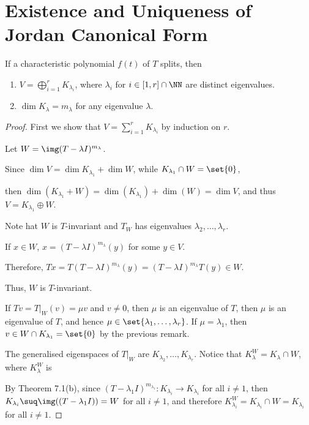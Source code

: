 \documentclass[11pt]{scrartcl}
\begin{document}
\section{Existence and Uniqueness of Jordan Canonical Form}

\begin{theorem}
  If a characteristic polynomial $f(t)$ of $T$ splits, then
  \begin{enumerate}[label=\alph*)]
  \item $V = \bigoplus_{i=1}^r K_{\lambda_i}$, where $\lambda_i$ for $i\in [1, r]\cap\NN$ are distinct eigenvalues.
  \item $\dim K_{\lambda} = m_{\lambda}$ for any eigenvalue $\lambda$.
  \end{enumerate}
\end{theorem}
\begin{proof}
  \hfill

  First we show that $V = \sum_{i=1}^rK_{\lambda_i}$ by induction on $r$.

  Let $W = \img (T-\lambda I)^{m_{\lambda}}$.

  Since $\dim V = \dim K_{\lambda_1} +\dim W$, while
  $K_{\lambda_1}\cap W = \set{0}$,

  then $\dim(K_{\lambda_1}+W) = \dim(K_{\lambda_1})+\dim(W) = \dim V$,
  and thus $V = K_{\lambda_1}\oplus W$.

  Note hat $W$ is $T$-invariant and $T_{W}$ has eigenvalues
  $\lambda_2,\dots, \lambda_r$.

  If $x\in W$, $x = (T-\lambda I)^{m_{\lambda}}(y)$ for some $y\in
  V$.

  Therefore,
  $Tx = T(T-\lambda I)^{m_{\lambda}}(y)=(T-\lambda
  I)^{m_{\lambda}}T(y) \in W$.

  Thus, $W$ is $T$-invariant.

  If $Tv = T|_W(v) = \mu v$ and $v\neq 0$, then $\mu$ is an eigenvalue of $T$, then $\mu$ is an eigenvalue of $T$, and hence $\mu \in \set{\lambda_1, \dots, \lambda_r}$. If $\mu = \lambda_1$, then $v\in W\cap K_{\lambda_1} = \set{0}$  by the previous remark.

  The generalised eigenspaces of $T|_W$ are
  $K_{\lambda_2}, \dots, K_{\lambda_r}$. Notice that
  $K_{\lambda}^W = K_{\lambda}\cap W$, where $K_{\lambda}^{W}$ is 

  By Theorem 7.1(b), since
  $(T-\lambda_1I)^{m_{\lambda_{1}}}:K_{\lambda_i}\to K_{\lambda_i}$
  for all $i\neq 1$, then
  $K_{\lambda_i} \suq \img((T-\lambda_1I)) = W$ for all $i\neq 1$, and
  therefore $K_{\lambda_i}^W = K_{\lambda_i}\cap W = K_{\lambda_i}$ for all $i\neq 1$.


\end{proof}
\end{document}
